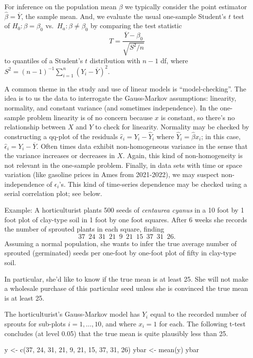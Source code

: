 \documentclass[
]{book}
\newenvironment{Shaded}{\begin{snugshade}}{\end{snugshade}}
\newcommand{\DecValTok}[1]{\textcolor[rgb]{0.00,0.00,0.81}{#1}}
\newcommand{\FunctionTok}[1]{\textcolor[rgb]{0.00,0.00,0.00}{#1}}
\newcommand{\NormalTok}[1]{#1}
\newcommand{\OtherTok}[1]{\textcolor[rgb]{0.56,0.35,0.01}{#1}}
\begin{document}
For inference on the population mean \(\beta\) we typically consider the point estimator \(\hat\beta = \overline Y\), the sample mean. And, we evaluate the usual one-sample Student's \(t\) test of \(H_0:\beta = \beta_0\) vs.~\(H_a:\beta\ne\beta_0\) by comparing the test statistic
\[T = \frac{\overline Y - \beta_0}{\sqrt{S^2/n}}\]
to quantiles of a Student's \(t\) distribution with \(n-1\) df, where \(S^2 = (n-1)^{-1}\sum_{i=1}^n(Y_i - \overline Y)^2\).

A common theme in the study and use of linear models is ``model-checking''. The idea is to us the data to interrogate the Gauss-Markov assumptions: linearity, normality, and constant variance (and sometimes independence). In the one-sample problem linearity is of no concern because \(x\) is constant, so there's no relationship between \(X\) and \(Y\) to check for linearity. Normality may be checked by constructing a qq-plot of the residuals \(\hat\epsilon_i = Y_i - \hat Y_i\) where \(\hat Y_i = \hat\beta x_i\); in this case, \(\hat\epsilon_i = Y_i - \overline Y\). Often times data exhibit non-homogeneous variance in the sense that the variance increases or decreases in \(X\). Again, this kind of non-homogeneity is not relevant in the one-sample problem. Finally, in data sets with time or space variation (like gasoline prices in Ames from 2021-2022), we may suspect non-independence of \(\epsilon_i\)'s. This kind of time-series dependence may be checked using a serial correlation plot; see below.

Example: A horticulturist plants 500 seeds of \emph{centaurea cyanus} in a 10 foot by 1 foot plot of clay-type soil in 1 foot by one foot squares. After 6 weeks she records the number of sprouted plants in each square, finding
\[37\,\,\, 24\,\,\, 31\,\,\, 21\,\,\,  9\,\,\, 21\,\,\, 15\,\,\, 37\,\,\, 31\,\,\, 26.\]
Assuming a normal population, she wants to infer the true average number of sprouted (germinated) seeds per one-foot by one-foot plot of fifty in clay-type soil.

In particular, she'd like to know if the true mean is at least 25. She will not make a wholesale purchase of this particular seed unless she is convinced the true mean is at least 25.

The horticulturist's Gauss-Markov model has \(Y_i\) equal to the recorded number of sprouts for sub-plots \(i=1, \ldots, 10\), and where \(x_i = 1\) for each. The following t-test concludes (at level 0.05) that the true mean is quite plausibly less than 25.

\begin{Shaded}
\begin{Highlighting}[]
\NormalTok{y }\OtherTok{\textless{}{-}} \FunctionTok{c}\NormalTok{(}\DecValTok{37}\NormalTok{, }\DecValTok{24}\NormalTok{, }\DecValTok{31}\NormalTok{, }\DecValTok{21}\NormalTok{,  }\DecValTok{9}\NormalTok{, }\DecValTok{21}\NormalTok{, }\DecValTok{15}\NormalTok{, }\DecValTok{37}\NormalTok{, }\DecValTok{31}\NormalTok{, }\DecValTok{26}\NormalTok{)}
\NormalTok{ybar }\OtherTok{\textless{}{-}} \FunctionTok{mean}\NormalTok{(y)}
\NormalTok{ybar}
\end{Highlighting}
\end{Shaded}
\end{document}
